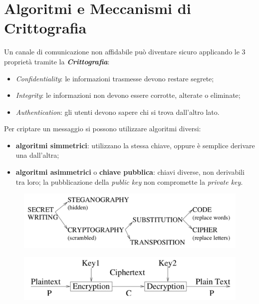 \documentclass[11pt, a4paper, twoside, italian]{report}
\theoremstyle{plain}
\begin{document}
\chapter*{Algoritmi e Meccanismi di Crittografia}
Un canale di comunicazione non affidabile può diventare sicuro applicando le 3 proprietà tramite la \textit{\textbf{Crittografia}}:
\begin{itemize}
	\item \textit{Confidentiality}: le informazioni trasmesse devono restare segrete;
	\item \textit{Integrity}: le informazioni non devono essere corrotte, alterate o eliminate;
	\item \textit{Authentication}: gli utenti devono sapere chi si trova dall'altro lato.
\end{itemize}
\noindent
Per criptare un messaggio si possono utilizzare algoritmi diversi:
\begin{multicols}{2}
\begin{itemize}
	\item \textbf{algoritmi simmetrici}: utilizzano la stessa chiave, oppure è semplice derivare una dall'altra;
\end{itemize}
\columnbreak
\begin{itemize}
	\item \textbf{algoritmi asimmetrici} o \textbf{chiave pubblica}: chiavi diverse, non derivabili tra loro; la pubblicazione della \textit{public key} non compromette la \textit{private key}.
\end{itemize}
\end{multicols}
\begin{multicols}{2}
	\begin{figure}[H]
		\centering
		\includegraphics[scale=0.45]{hide}
	\end{figure}
\columnbreak
\begin{figure}[H]
	\centering
	\includegraphics[scale=0.45]{keys}
\end{figure}
\end{multicols}
\end{document}
